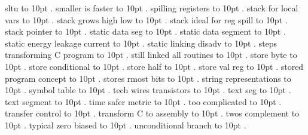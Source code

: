 \smallskip
sltu \leaders\hbox to 10pt {\hss.\hss}  \hfill {}
\smallskip
smaller is faster \leaders\hbox to 10pt {\hss.\hss}  \hfill {}
\smallskip
spilling registers \leaders\hbox to 10pt {\hss.\hss}  \hfill {}
\smallskip
stack for local vars \leaders\hbox to 10pt {\hss.\hss}  \hfill {}
\smallskip
stack grows high low \leaders\hbox to 10pt {\hss.\hss}  \hfill {}
\smallskip
stack ideal for reg spill \leaders\hbox to 10pt {\hss.\hss}  \hfill {}
\smallskip
stack pointer \leaders\hbox to 10pt {\hss.\hss}  \hfill {}
\smallskip
static data seg \leaders\hbox to 10pt {\hss.\hss}  \hfill {}
\smallskip
static data segment \leaders\hbox to 10pt {\hss.\hss}  \hfill {}
\smallskip
static energy leakage current \leaders\hbox to 10pt {\hss.\hss}  \hfill {}
\smallskip
static linking disadv \leaders\hbox to 10pt {\hss.\hss}  \hfill {}
\smallskip
steps transforming C program \leaders\hbox to 10pt {\hss.\hss}  \hfill {}
\smallskip
still linked all routines \leaders\hbox to 10pt {\hss.\hss}  \hfill {}
\smallskip
store byte \leaders\hbox to 10pt {\hss.\hss}  \hfill {}
\smallskip
store conditional \leaders\hbox to 10pt {\hss.\hss}  \hfill {}
\smallskip
store half \leaders\hbox to 10pt {\hss.\hss}  \hfill {}
\smallskip
store val reg \leaders\hbox to 10pt {\hss.\hss}  \hfill {}
\smallskip
stored program concept \leaders\hbox to 10pt {\hss.\hss}  \hfill {}
\smallskip
stores rmost bits \leaders\hbox to 10pt {\hss.\hss}  \hfill {}
\smallskip
string representations \leaders\hbox to 10pt {\hss.\hss}  \hfill {}
\smallskip
symbol table \leaders\hbox to 10pt {\hss.\hss}  \hfill {}
\smallskip
tech wires transistors \leaders\hbox to 10pt {\hss.\hss}  \hfill {}
\smallskip
text seg \leaders\hbox to 10pt {\hss.\hss}  \hfill {}
\smallskip
text segment \leaders\hbox to 10pt {\hss.\hss}  \hfill {}
\smallskip
time safer metric \leaders\hbox to 10pt {\hss.\hss}  \hfill {}
\smallskip
too complicated \leaders\hbox to 10pt {\hss.\hss}  \hfill {}
\smallskip
transfer control \leaders\hbox to 10pt {\hss.\hss}  \hfill {}
\smallskip
transform C to assembly \leaders\hbox to 10pt {\hss.\hss}  \hfill {}
\smallskip
twos complement \leaders\hbox to 10pt {\hss.\hss}  \hfill {}
\smallskip
typical zero biased \leaders\hbox to 10pt {\hss.\hss}  \hfill {}
\smallskip
unconditional branch \leaders\hbox to 10pt {\hss.\hss}  \hfill {}
\smallskip
